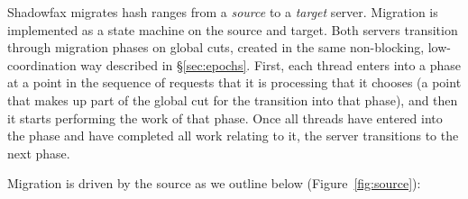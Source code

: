 Shadowfax migrates hash ranges from a \emph{source} to a \emph{target} server.
%
Migration is implemented as a state machine on the source and target.
%
Both servers transition through migration phases on global cuts, created in the
same non-blocking, low-coordination way described in \S\ref{sec:epochs}.
%
First, each thread enters into a phase at a point in the sequence of requests
that it is processing that it chooses (a point that makes up part of the global
cut for the transition into that phase), and then it starts performing the work
of that phase.
%
Once all threads have entered into the phase and have completed all work
relating to it, the server transitions to the next phase.

Migration is driven by the source as we outline below (Figure~\ref{fig:source}):
%
%


